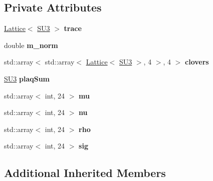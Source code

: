 \subsection*{Private Attributes}
\begin{DoxyCompactItemize}
\item 
\hyperlink{classLattice}{Lattice}$<$ \hyperlink{structSU3}{S\+U3} $>$ {\bfseries trace}\hypertarget{classSuperObs_aa3810a233cc5ba81920b26c05b69fec2}{}\label{classSuperObs_aa3810a233cc5ba81920b26c05b69fec2}

\item 
double {\bfseries m\+\_\+norm}\hypertarget{classSuperObs_aee29fc04affddd9b71d918f5b36dbe17}{}\label{classSuperObs_aee29fc04affddd9b71d918f5b36dbe17}

\item 
std\+::array$<$ std\+::array$<$ \hyperlink{classLattice}{Lattice}$<$ \hyperlink{structSU3}{S\+U3} $>$, 4 $>$, 4 $>$ {\bfseries clovers}\hypertarget{classSuperObs_ab59fe1a306183d36cf2c2f706d5f4b97}{}\label{classSuperObs_ab59fe1a306183d36cf2c2f706d5f4b97}

\item 
\hyperlink{structSU3}{S\+U3} {\bfseries plaq\+Sum}\hypertarget{classSuperObs_a66390e1acca325f4d505ff0db24f97b5}{}\label{classSuperObs_a66390e1acca325f4d505ff0db24f97b5}

\item 
std\+::array$<$ int, 24 $>$ {\bfseries mu}\hypertarget{classSuperObs_a69bfdb7e90d9c9c0cf156b3e0e635b14}{}\label{classSuperObs_a69bfdb7e90d9c9c0cf156b3e0e635b14}

\item 
std\+::array$<$ int, 24 $>$ {\bfseries nu}\hypertarget{classSuperObs_ae49098e2ed19e81871c3ff399911e5f4}{}\label{classSuperObs_ae49098e2ed19e81871c3ff399911e5f4}

\item 
std\+::array$<$ int, 24 $>$ {\bfseries rho}\hypertarget{classSuperObs_a58a715a80aad21518378806174d241dd}{}\label{classSuperObs_a58a715a80aad21518378806174d241dd}

\item 
std\+::array$<$ int, 24 $>$ {\bfseries sig}\hypertarget{classSuperObs_a460981ed26aa39f24d7a8da65d8813ec}{}\label{classSuperObs_a460981ed26aa39f24d7a8da65d8813ec}

\end{DoxyCompactItemize}
\subsection*{Additional Inherited Members}


